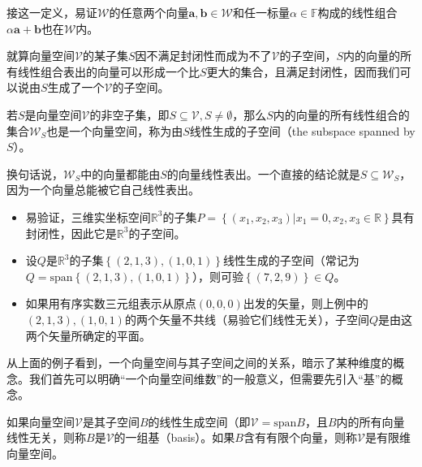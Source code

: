 \documentclass[main.tex]{subfiles}
\begin{document}
接这一定义，易证$\mathcal{W}$的任意两个向量$\mathbf{a},\mathbf{b}\in\mathcal{W}$和任一标量$\alpha\in\mathbb{F}$构成的线性组合$\alpha\mathbf{a}+\mathbf{b}$也在$\mathcal{W}$内\cite[\S 7.1定理1.1,p.169]{周胜林2012线性代数}。

就算向量空间$\mathcal{V}$的某子集$S$因不满足封闭性而成为不了$\mathcal{V}$的子空间，$S$内的向量的所有线性组合表出的向量可以形成一个比$S$更大的集合，且满足封闭性，因而我们可以说由$S$生成了一个$\mathcal{V}$的子空间。

\begin{definition}[线性生成空间]\label{def:II.2.4}
若$S$是向量空间$\mathcal{V}$的非空子集，即$S\subseteq\mathcal{V},S\neq\emptyset$，那么$S$内的向量的所有线性组合的集合$\mathcal{W}_S$也是一个向量空间，称为由$S$线性生成的子空间（the subspace spanned by $S$）。
\end{definition}

换句话说，$\mathcal{W}_S$中的向量都能由$S$的向量线性表出。一个直接的结论就是$S\subseteq\mathcal{W}_S$，因为一个向量总能被它自己线性表出。

\begin{example}\label{exp:II.2.2}
\quad
\begin{itemize}
\item 易验证，三维实坐标空间$\mathbb{R}^3$的子集$P=\left\{\left(x_1,x_2,x_3\right)|x_1=0,x_2,x_3\in\mathbb{R}\right\}$具有封闭性，因此它是$\mathbb{R}^3$的子空间。
\item 设$Q$是$\mathbb{R}^3$的子集$\left\{\left(2,1,3\right),\left(1,0,1\right)\right\}$线性生成的子空间（常记为$Q=\mathrm{span}\left\{\left(2,1,3\right),\left(1,0,1\right)\right\}$），则可验$\left\{\left(7,2,9\right)\right\}\in Q$。
\item 如果用有序实数三元组表示从原点$\left(0,0,0\right)$出发的矢量，则上例中的$\left(2,1,3\right),\left(1,0,1\right)$的两个矢量不共线（易验它们线性无关），子空间$Q$是由这两个矢量所确定的平面。
\end{itemize}
\end{example}

从上面的例子看到，一个向量空间与其子空间之间的关系，暗示了某种维度的概念。我们首先可以明确“一个向量空间维数”的一般意义，但需要先引入“基”的概念。

\begin{definition}[基]\label{def:II.2.5}
如果向量空间$\mathcal{V}$是其子空间$B$的线性生成空间（即$\mathcal{V}=\mathrm{span}B$，且$B$内的所有向量线性无关，则称$B$是$\mathcal{V}$的一组基（basis）。如果$B$含有有限个向量，则称$\mathcal{V}$是有限维向量空间。
\end{definition}
\end{document}
